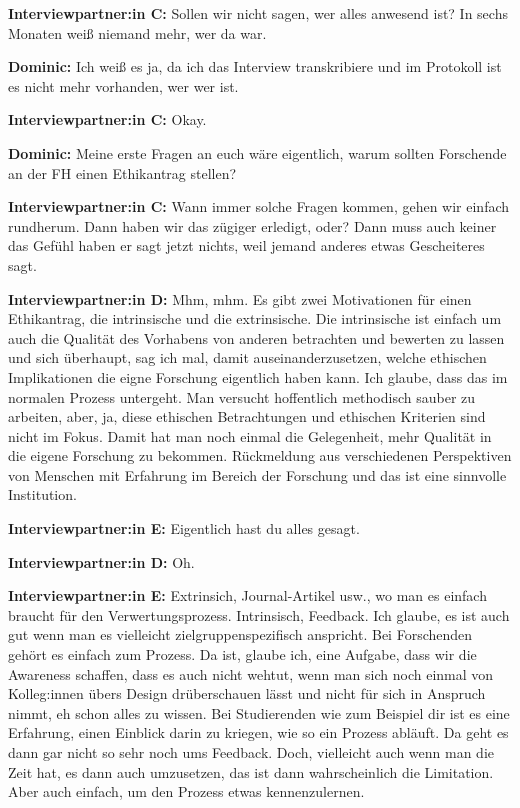 \documentclass[a4paper,12pt,twoside]{scrreprt}
\begin{document}
\textbf{Interviewpartner:in C:} Sollen wir nicht sagen, wer alles anwesend ist? In sechs Monaten weiß niemand mehr, wer da war.

\textbf{Dominic:} Ich weiß es ja, da ich das Interview transkribiere und im Protokoll ist es nicht mehr vorhanden, wer wer ist.

\textbf{Interviewpartner:in C:} Okay.

\textbf{Dominic:} Meine erste Fragen an euch wäre eigentlich, warum sollten Forschende an der FH einen Ethikantrag stellen?

\textbf{Interviewpartner:in C:} Wann immer solche Fragen kommen, gehen wir einfach rundherum. Dann haben wir das zügiger erledigt, oder? Dann muss auch keiner das Gefühl haben er sagt jetzt nichts, weil jemand anderes etwas Gescheiteres sagt.

\textbf{Interviewpartner:in D:} Mhm, mhm. Es gibt zwei Motivationen für einen Ethikantrag, die intrinsische und die extrinsische. Die intrinsische ist einfach um auch die Qualität des Vorhabens von anderen betrachten und bewerten zu lassen und sich überhaupt, sag ich mal, damit auseinanderzusetzen, welche ethischen Implikationen die eigne Forschung eigentlich haben kann. Ich glaube, dass das im normalen Prozess untergeht. Man versucht hoffentlich methodisch sauber zu arbeiten, aber, ja, diese ethischen Betrachtungen und ethischen Kriterien sind nicht im Fokus. Damit hat man noch einmal die Gelegenheit, mehr Qualität in die eigene Forschung zu bekommen. Rückmeldung aus verschiedenen Perspektiven von Menschen mit Erfahrung im Bereich der Forschung und das ist eine sinnvolle Institution.

\textbf{Interviewpartner:in E:} Eigentlich hast du alles gesagt.

\textbf{Interviewpartner:in D:} Oh.

\textbf{Interviewpartner:in E:} Extrinsich, Journal-Artikel usw., wo man es einfach braucht für den Verwertungsprozess. Intrinsisch, Feedback. Ich glaube, es ist auch gut wenn man es vielleicht zielgruppenspezifisch anspricht. Bei Forschenden gehört es einfach zum Prozess. Da ist, glaube ich, eine Aufgabe, dass wir die Awareness schaffen, dass es auch nicht wehtut, wenn man sich noch einmal von Kolleg:innen übers Design drüberschauen lässt und nicht für sich in Anspruch nimmt, eh schon alles zu wissen. Bei Studierenden wie zum Beispiel dir ist es eine Erfahrung, einen Einblick darin zu kriegen, wie so ein Prozess abläuft. Da geht es dann gar nicht so sehr noch ums Feedback. Doch, vielleicht auch wenn man die Zeit hat, es dann auch umzusetzen, das ist dann wahrscheinlich die Limitation. Aber auch einfach, um den Prozess etwas kennenzulernen.
\end{document}
